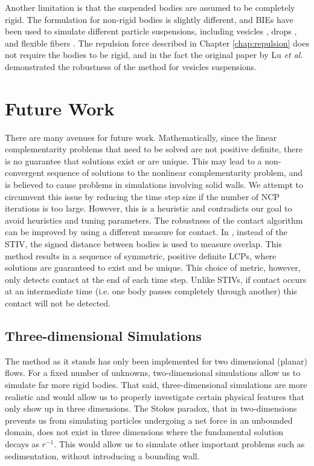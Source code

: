 Another limitation is that the suspended bodies are assumed to be completely rigid. The formulation for non-rigid bodies is slightly different, and BIEs have been used to simulate different particle suspensions, including vesicles \cite{Quaife2014, Quaife2015, Rahimian2010}, drops \cite{Sorgentone2018}, and flexible fibers \cite{Tornberg2004}. The repulsion force described in Chapter \ref{chap:repulsion} does not require the bodies to be rigid, and in the fact the original paper by Lu \emph{et al.}~\cite{Lu2017} demonstrated the robustness of the method for vesicles suspensions.

\section{Future Work}

There are many avenues for future work. Mathematically, since the linear complementarity problems that need to be solved are not positive definite, there is no guarantee that solutions exist or are unique. This may lead to a non-convergent sequence of solutions to the nonlinear complementarity problem, and is believed to cause problems in simulations involving solid walls. We attempt to circumvent this issue by reducing the time step size if the number of NCP iterations is too large. However, this is a heuristic and contradicts our goal to avoid heuristics and tuning parameters. The robustness of the contact algorithm can be improved by using a different measure for contact. In \cite{Yan2017}, instead of the STIV, the signed distance between bodies is used to measure overlap. This method results in a sequence of symmetric, positive definite LCPs, where solutions are guaranteed to exist and be unique. This choice of metric, however, only detects contact at the end of each time step. Unlike STIVs, if contact occurs at an intermediate time (i.e. one body passes completely through another) this contact will not be detected. 

\subsection{Three-dimensional Simulations}

The method as it stands has only been implemented for two dimensional (planar) flows. For a fixed number of unknowns, two-dimensional simulations allow us to simulate far more rigid bodies. That said, three-dimensional simulations are more realistic and would allow us to properly investigate certain physical features that only show up in three dimensions. The Stokes paradox, that in two-dimensions prevents us from simulating particles undergoing a net force in an unbounded domain, does not exist in three dimensions where the fundamental solution decays as $r^{-1}$. This would allow us to simulate  other important problems such as sedimentation, without introducing a bounding wall.

